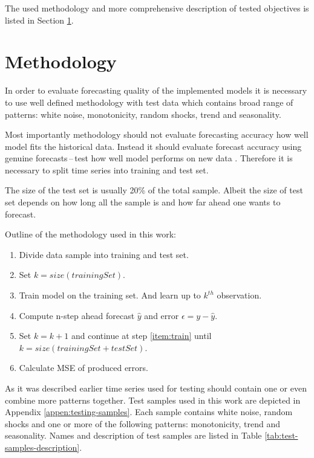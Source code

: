 The used methodology and more comprehensive description of tested objectives is listed in Section \ref{sec:methodology}.

    \section{Methodology} \label{sec:methodology}
    In order to evaluate forecasting quality of the implemented models it is necessary to use well defined
    methodology with test data which contains broad range of patterns: white noise, monotonicity, random
    shocks, trend and seasonality.

    Most importantly methodology should not evaluate forecasting accuracy how well model
    fits the historical data. Instead it should evaluate forecast accuracy using genuine forecasts\,--\,test
    how well model performs on new data \cite{otexts}. Therefore it is necessary to split time series into training
    and test set.

    The size of the test set is usually 20\% of the total sample. Albeit the size of test set depends on how
    long all the sample is and how far ahead one wants to forecast.

    Outline of the methodology used in this work:
    \begin{enumerate} \label{enum:methodology}
        \item Divide data sample into training and test set.
        \item Set $k = size(trainingSet)$.
        \item Train model on the training set. And learn up to $k^{th}$ observation. \label{item:train}
        \item Compute n-step ahead forecast $\hat{y}$ and error $\epsilon = y-\hat{y}$.
        \item Set $k = k+1$ and continue at step \ref{item:train} until $k=size(trainingSet + testSet)$.
        \item Calculate MSE of produced errors.
    \end{enumerate}

    As it was described earlier time series used for testing should contain one or even combine more patterns together.
    Test samples used in this work are depicted in Appendix \ref{appen:testing-samples}. Each sample contains white
    noise, random shocks and one or more of the following patterns: monotonicity, trend and seasonality. Names and
    description of test samples are listed in Table \ref{tab:test-samples-description}.

